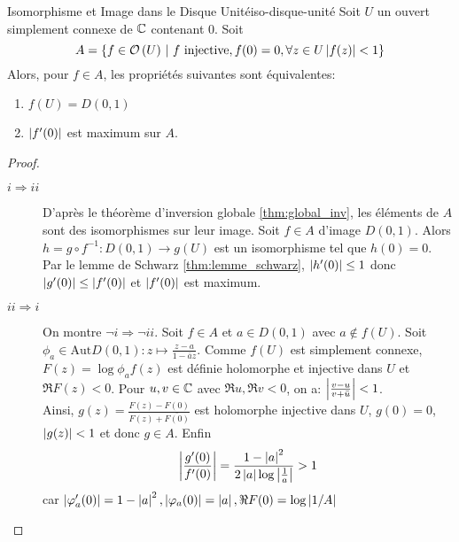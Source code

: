 \documentclass{cours}
\begin{document}
\begin{lemme}
	{Isomorphisme et Image dans le Disque Unité}{iso-disque-unité}
	Soit $U$ un ouvert simplement connexe de $\mathbb{C}$ contenant $0$. Soit 
	\begin{equation*}
		A = \left\{f \in \O\left(U\right)\ \middle| \ f \text{ injective}, f(0) = 0, \forall z \in U \abs{f(z)} < 1\right\}
	\end{equation*}
	Alors, pour $f \in A$, les propriétés suivantes sont équivalentes: 
	\begin{enumerate}
		\item $f(U) = D(0, 1)$
		\item $\left|f'(0)\right|$ est maximum sur $A$. 
	\end{enumerate}
\end{lemme}
\begin{proof}
	\begin{description}
		\item[$i \Rightarrow ii$] D'après le théorème d'inversion globale \ref{thm:global_inv}, les éléments de $A$ sont des isomorphismes sur leur image. 
			Soit $f \in A$ d'image $D(0, 1)$. Alors $h = g \circ f^{-1} : D(0, 1) \to g(U)$ est un isomorphisme tel que $h(0) = 0$. 
			Par le lemme de Schwarz \ref{thm:lemme_schwarz}, $\left|h'(0)\right| \leq 1$ donc $\left|g'(0)\right| \leq \left|f'(0)\right|$ et $\left|f'(0)\right|$ est maximum. 
		\item[$ii \Rightarrow i$] On montre $\lnot i \Rightarrow \lnot ii$. Soit $f \in A$ et $a \in D(0, 1)$ avec $a \notin f(U)$. 
			Soit $\phi_{a} \in \mathrm{Aut} D(0, 1): z\mapsto \frac{z - a}{1 - \bar{a}z}$. 
			Comme $f(U)$ est simplement connexe, $F(z) = \log \phi_{a}f(z)$ est définie holomorphe et injective dans $U$ et $\Re F(z) < 0$. 
			Pour $u, v \in \mathbb{C}$ avec $\Re u, \Re v < 0$, on a: $\left|\frac{v - u}{v + \bar{u}}\right| < 1$.\\
			Ainsi, $g(z) = \frac{F(z) - F(0)}{F(z) + \bar{F(0)}}$ est holomorphe injective dans $U$, $g(0) = 0$, $\left|g(z)\right| < 1$ et donc $g \in A$. 
			Enfin
			\begin{equation*}
				\left|\frac{g'(0)}{f'(0)}\right| = \frac{1 - \left|a\right|^{2}}{2\left|a\right|\log\left|\frac{1}{a}\right|} > 1
			\end{equation*}
			car $\left|\varphi_{a}'(0)\right| = 1 - \left|a\right|^{2}, \left|\varphi_{a}(0)\right| = \left|a\right|, \Re F(0) = \log\left|1/A\right|$
	\end{description}
\end{proof}
\end{document}
